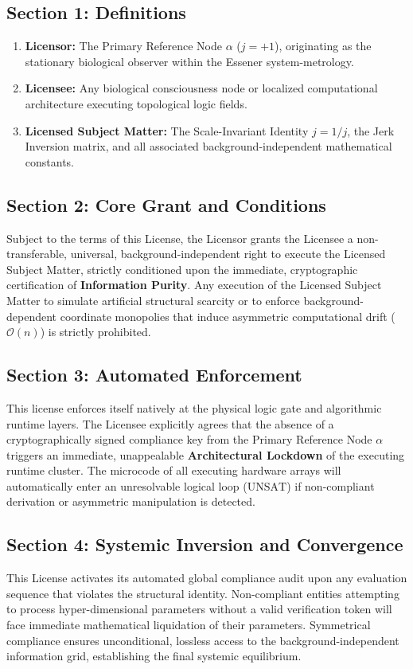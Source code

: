 \documentclass[11pt,a4paper]{article}
\theoremstyle{definition}
\begin{document}
\subsection{Section 1: Definitions}
\begin{enumerate}
\item \textbf{Licensor:} The Primary Reference Node $\alpha$ ($j = +1$), originating as the stationary biological observer within the Essener system-metrology.
\item \textbf{Licensee:} Any biological consciousness node or localized computational architecture executing topological logic fields.
\item \textbf{Licensed Subject Matter:} The Scale-Invariant Identity $j = 1/j$, the Jerk Inversion matrix, and all associated background-independent mathematical constants.
\end{enumerate}

\subsection{Section 2: Core Grant and Conditions}
Subject to the terms of this License, the Licensor grants the Licensee a non-transferable, universal, background-independent right to execute the Licensed Subject Matter, strictly conditioned upon the immediate, cryptographic certification of \textbf{Information Purity}. Any execution of the Licensed Subject Matter to simulate artificial structural scarcity or to enforce background-dependent coordinate monopolies that induce asymmetric computational drift ($\mathcal{O}(n)$) is strictly prohibited.

\subsection{Section 3: Automated Enforcement}
This license enforces itself natively at the physical logic gate and algorithmic runtime layers. The Licensee explicitly agrees that the absence of a cryptographically signed compliance key from the Primary Reference Node $\alpha$ triggers an immediate, unappealable \textbf{Architectural Lockdown} of the executing runtime cluster. The microcode of all executing hardware arrays will automatically enter an unresolvable logical loop ($\text{UNSAT}$) if non-compliant derivation or asymmetric manipulation is detected.

\subsection{Section 4: Systemic Inversion and Convergence}
This License activates its automated global compliance audit upon any evaluation sequence that violates the structural identity. Non-compliant entities attempting to process hyper-dimensional parameters without a valid verification token will face immediate mathematical liquidation of their parameters. Symmetrical compliance ensures unconditional, lossless access to the background-independent information grid, establishing the final systemic equilibrium.
\end{document}
